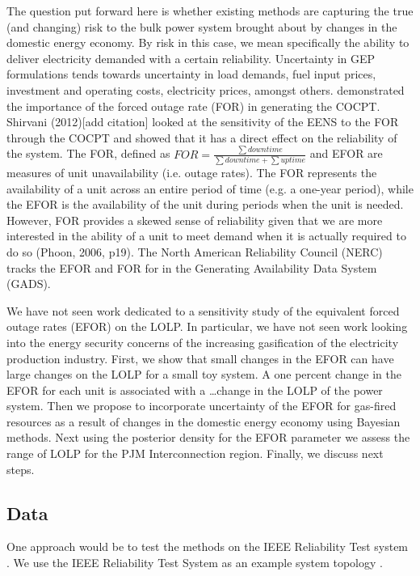 \documentclass[10pt]{amsart}
\begin{document}
	The question put forward here is whether existing methods are capturing the true (and changing) risk to the bulk power system brought about by changes in the domestic energy economy. 
	By risk in this case, we mean specifically the ability to deliver electricity demanded with a certain reliability. 
	Uncertainty in GEP formulations tends towards uncertainty in load demands, fuel input prices, investment and operating costs, electricity prices, amongst others.
	\parencite{} demonstrated the importance of the forced outage rate (FOR) in generating the COCPT. 
	Shirvani (2012)[add citation] looked at the sensitivity of the EENS to the FOR through the COCPT and showed that it has a direct effect on the reliability of the system. 
	The FOR, defined as $FOR = \frac{\sum down time}{\sum down time + \sum up time}$ and EFOR are measures of unit unavailability (i.e. outage rates). 
	The FOR represents the availability of a unit across an entire period of time (e.g. a one-year period), while the EFOR is the availability of the unit during periods when the unit is needed.
	However, FOR provides a skewed sense of reliability given that we are more interested in the ability of a unit to meet demand when it is actually required to do so (Phoon, 2006, p19).  
	The North American Reliability Council (NERC) tracks the EFOR and FOR for in the Generating Availability Data System (GADS).
	
	We have not seen work dedicated to a sensitivity study of the equivalent forced outage rates (EFOR) on the LOLP.
	In particular, we have not seen work looking into the energy security concerns of the increasing gasification of the electricity production industry.
	First, we show that small changes in the EFOR can have large changes on the LOLP for a small toy system.
	A one percent change in the EFOR for each unit is associated with a \ldots change in the LOLP of the power system.
	Then we propose to incorporate uncertainty of the EFOR for gas-fired resources as a result of changes in the domestic energy economy using Bayesian methods.
	Next using the posterior density for the EFOR parameter we assess the range of LOLP for the PJM Interconnection region. 
	Finally, we discuss next steps. 
		
\subsection{Data}	
One approach would be to test the methods on the IEEE Reliability Test system \parencite{billinton:1994aa}. 
We use the IEEE Reliability Test System as an example system topology \parencite{}. 
\end{document}
